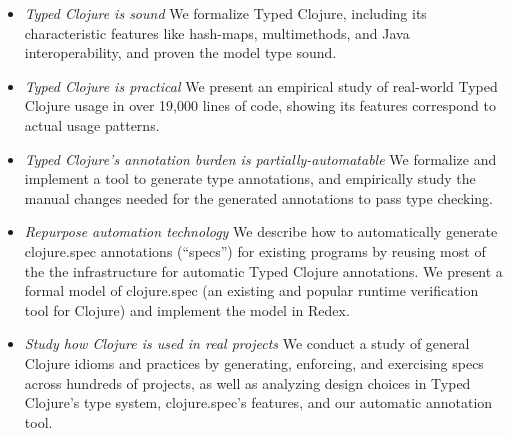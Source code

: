 \documentclass[9pt]{extarticle}
\begin{document}
\begin{itemize}
  \item \emph{Typed Clojure is sound} We formalize Typed Clojure, including
    its characteristic features like hash-maps, multimethods, and Java interoperability,
    and proven the model type sound.
  \item \emph{Typed Clojure is practical} We present an empirical study of real-world Typed Clojure usage
    in over 19,000 lines of code, showing its features correspond to actual usage patterns.
  \item \emph{Typed Clojure's annotation burden is partially-automatable} We formalize and implement a tool to generate
    type annotations, and empirically study the manual changes needed for the generated annotations
    to pass type checking.
  \item \emph{Repurpose automation technology}
    We describe how to automatically generate clojure.spec annotations (``specs'') for existing programs by reusing
    most of the the infrastructure for automatic Typed Clojure annotations.
    We present a formal model of clojure.spec (an existing and popular runtime verification tool for Clojure)
    and implement the model in Redex.
  \item \emph{Study how Clojure is used in real projects}
    We conduct a study of general Clojure idioms and practices by generating, enforcing, and exercising specs
    across hundreds of projects, as well as analyzing design choices in Typed Clojure's type system,
    clojure.spec's features, and our automatic annotation tool.


\end{itemize}
\end{document}
